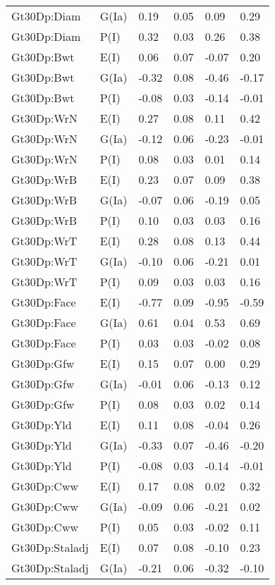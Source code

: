 \begin{center}
\begin{longtable}{|p{1.1in}|p{0.7in}|p{0.7in}|p{0.6in}|p{0.6in}|p{0.6in}|}
  Gt30Dp:Diam & G(Ia) & 0.19 & 0.05 & 0.09 & 0.29 \\ 
  Gt30Dp:Diam & P(I) & 0.32 & 0.03 & 0.26 & 0.38 \\ 
  Gt30Dp:Bwt & E(I) & 0.06 & 0.07 & -0.07 & 0.20 \\ 
  Gt30Dp:Bwt & G(Ia) & -0.32 & 0.08 & -0.46 & -0.17 \\ 
  Gt30Dp:Bwt & P(I) & -0.08 & 0.03 & -0.14 & -0.01 \\ 
  Gt30Dp:WrN & E(I) & 0.27 & 0.08 & 0.11 & 0.42 \\ 
  Gt30Dp:WrN & G(Ia) & -0.12 & 0.06 & -0.23 & -0.01 \\ 
  Gt30Dp:WrN & P(I) & 0.08 & 0.03 & 0.01 & 0.14 \\ 
  Gt30Dp:WrB & E(I) & 0.23 & 0.07 & 0.09 & 0.38 \\ 
  Gt30Dp:WrB & G(Ia) & -0.07 & 0.06 & -0.19 & 0.05 \\ 
  Gt30Dp:WrB & P(I) & 0.10 & 0.03 & 0.03 & 0.16 \\ 
  Gt30Dp:WrT & E(I) & 0.28 & 0.08 & 0.13 & 0.44 \\ 
  Gt30Dp:WrT & G(Ia) & -0.10 & 0.06 & -0.21 & 0.01 \\ 
  Gt30Dp:WrT & P(I) & 0.09 & 0.03 & 0.03 & 0.16 \\ 
  Gt30Dp:Face & E(I) & -0.77 & 0.09 & -0.95 & -0.59 \\ 
  Gt30Dp:Face & G(Ia) & 0.61 & 0.04 & 0.53 & 0.69 \\ 
  Gt30Dp:Face & P(I) & 0.03 & 0.03 & -0.02 & 0.08 \\ 
  Gt30Dp:Gfw & E(I) & 0.15 & 0.07 & 0.00 & 0.29 \\ 
  Gt30Dp:Gfw & G(Ia) & -0.01 & 0.06 & -0.13 & 0.12 \\ 
  Gt30Dp:Gfw & P(I) & 0.08 & 0.03 & 0.02 & 0.14 \\ 
  Gt30Dp:Yld & E(I) & 0.11 & 0.08 & -0.04 & 0.26 \\ 
  Gt30Dp:Yld & G(Ia) & -0.33 & 0.07 & -0.46 & -0.20 \\ 
  Gt30Dp:Yld & P(I) & -0.08 & 0.03 & -0.14 & -0.01 \\ 
  Gt30Dp:Cww & E(I) & 0.17 & 0.08 & 0.02 & 0.32 \\ 
  Gt30Dp:Cww & G(Ia) & -0.09 & 0.06 & -0.21 & 0.02 \\ 
  Gt30Dp:Cww & P(I) & 0.05 & 0.03 & -0.02 & 0.11 \\ 
  Gt30Dp:Staladj & E(I) & 0.07 & 0.08 & -0.10 & 0.23 \\ 
  Gt30Dp:Staladj & G(Ia) & -0.21 & 0.06 & -0.32 & -0.10 \\ 

\end{longtable}
\end{center}
